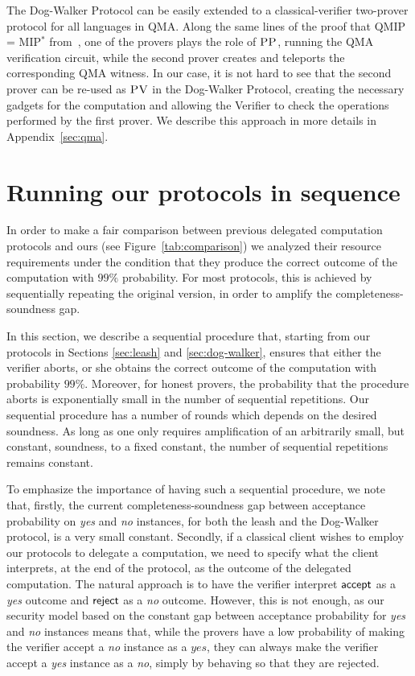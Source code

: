 \documentclass[11pt]{article}
\theoremstyle{remark}
\theoremstyle{definition}
\newcommand{\pv}{\textsc{PV}}
\newcommand{\pp}{\textsc{PP}}
\begin{document}
The Dog-Walker Protocol can be easily extended to a classical-verifier  two-prover protocol for all languages in QMA. 
Along the same lines of the proof that QMIP = MIP$^*$ from~\cite{reichardt2012classical}, one of the provers plays the role of $\pp$, running the  QMA verification circuit, while the second prover creates and teleports the corresponding QMA witness. In our case, it is not hard to see that the second prover can be  re-used as $\pv$ in the Dog-Walker Protocol, creating the necessary gadgets for the computation and allowing the Verifier to check the operations performed by the first prover.  We describe this approach in more details in Appendix~\ref{sec:qma}.



\section{Running our protocols in sequence}
\label{sec:sequential}

In order to make a fair comparison between previous delegated computation protocols and ours (see Figure~\ref{tab:comparison}) we analyzed their resource requirements under the condition that they produce the correct outcome of the computation with $99\%$ probability. For most protocols, this is achieved by sequentially repeating the original version, in order to amplify the completeness-soundness gap. 

In this section, we describe a sequential procedure that, starting from our protocols in Sections \ref{sec:leash} and \ref{sec:dog-walker}, ensures that either the verifier aborts, or she obtains the correct outcome of the computation with probability $99\%$. Moreover, for honest provers, the probability that the procedure aborts is exponentially small in the number of sequential repetitions. Our sequential procedure has a number of rounds which depends on the desired soundness. As long as one only requires amplification of an arbitrarily small, but constant, soundness, to a fixed constant, the number of sequential repetitions remains constant.

To emphasize the importance of having such a sequential procedure, we note that, firstly, the current completeness-soundness gap between acceptance probability on \textit{yes} and \textit{no} instances, for both the leash and the Dog-Walker protocol, is a very small constant. Secondly, if a classical client wishes to employ our protocols to delegate a computation, we need to specify what the client interprets, at the end of the protocol, as the outcome of the delegated computation. The natural approach is to have the verifier interpret $\sf accept$ as a \textit{yes} outcome and $\sf reject$ as a \textit{no} outcome. However, this is not enough, as our security model based on the constant gap between acceptance probability for \textit{yes} and \textit{no} instances means that, while the provers have a low probability of making the verifier accept a \textit{no} instance as a $\textit{yes}$, they can always make the verifier accept a \textit{yes} instance as a \textit{no}, simply by behaving so that they are rejected.
\end{document}

